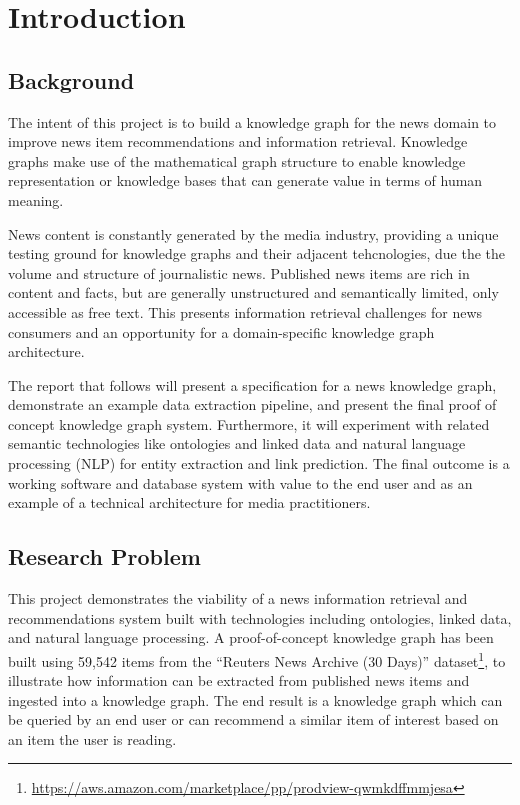 \documentclass[11pt]{article}
\begin{document}
\newpage
\tableofcontents

\newpage
\section{Introduction}

\subsection{Background}

The intent of this project is to build a knowledge graph for the news domain to improve news item recommendations and information retrieval. Knowledge graphs make use of the mathematical graph structure to enable knowledge representation or knowledge bases that can generate value in terms of human meaning.

News content is constantly generated by the media industry, providing a unique testing ground for knowledge graphs and their adjacent tehcnologies, due the the volume and structure of journalistic news. Published news items are rich in content and facts, but are generally unstructured and semantically limited, only accessible as free text. This presents information retrieval challenges for news consumers and an opportunity for a domain-specific knowledge graph architecture.

The report that follows will present a specification for a news knowledge graph, demonstrate an example data extraction pipeline, and present the final proof of concept knowledge graph system. Furthermore, it will experiment with related semantic technologies like ontologies and linked data and natural language processing (NLP) for entity extraction and link prediction. The final outcome is a working software and database system with value to the end user and as an example of a technical architecture for media practitioners.

\subsection{Research Problem}

This project demonstrates the viability of a news information retrieval and recommendations system built with technologies including ontologies, linked data, and natural language processing. A proof-of-concept knowledge graph has been built using 59,542 items from the ``Reuters News Archive (30 Days)'' dataset\footnote{\url{https://aws.amazon.com/marketplace/pp/prodview-qwmkdffmmjesa}}, to illustrate how information can be extracted from published news items and ingested into a knowledge graph. The end result is a knowledge graph which can be queried by an end user or can recommend a similar item of interest based on an item the user is reading.
\end{document}
